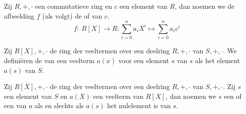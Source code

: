 \documentclass[main.tex]{subfiles}
\begin{document}
\begin{de}
  Zij $R,+,\cdot$ een commutatieve ring en $c$ een element van $R$, dan noemen we de afbeelding $f$ (als volgt) de  of  van $c$.
  \[ f:\ R[X] \rightarrow R: \sum_{i=0}^{n}a_{i}X^{i} \mapsto \sum_{i=0}^{n}a_{i}c^{i} \]
\end{de}

\begin{de}
  Zij $R[X],+,\cdot$ de ring der veeltermen over een deelring $R,+,\cdot$ van $S,+,\cdot$.
  We defini\"eren de  van een veelterm $a(x)$ voor een element $s$ van $s$ als het element $a(s)$ van $S$.
\end{de}

\begin{de}
  Zij $R[X],+,\cdot$ de ring der veeltermen over een deelring $R,+,\cdot$ van $S,+,\cdot$.
  Zij $s$ een element van $S$ en $a(X)$ een veelterm van $R[X]$, dan noemen we $s$ een  of een  van $a$ als en slechts als $a(s)$ het nulelement is van $s$.
\end{de}
\end{document}
